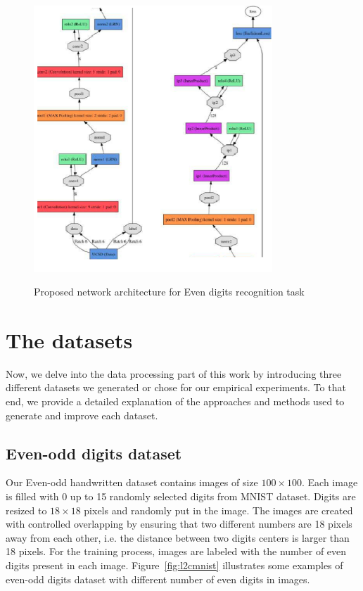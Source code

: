 \begin{figure}[H]
  \centering
   {\includegraphics[width=0.8\textwidth]{images/model2}}
	\caption{Proposed network architecture for Even digits recognition task}
	\label{fig:ucsdnet}
\end{figure}

\section{The datasets}
\label{dataha}
Now, we delve into the data processing part of this work by introducing three different datasets we generated or chose for our empirical experiments. To that end, we provide a detailed explanation of the approaches and methods used to generate and improve each dataset.

\subsection{Even-odd digits dataset}
\label{subsubsec:digit}

Our Even-odd handwritten dataset contains images of size $100\times100$. Each image is filled with 0 up to 15 randomly selected digits from MNIST dataset. Digits are resized to $18\times18$ pixels and randomly put in the image. The images are created with controlled overlapping by ensuring that two different numbers are 18 pixels away from each other, i.e. the distance between two digits centers is larger than 18 pixels. For the training process, images are labeled with the number of even digits present in each image. Figure~\ref{fig:l2cmnist} illustrates some examples of even-odd digits dataset with different number of even digits in images. 

